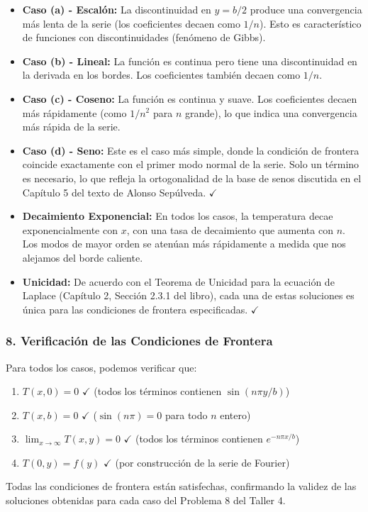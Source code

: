 \documentclass[a4paper]{article}
\begin{document}
\begin{itemize}
    \item \textbf{Caso (a) - Escalón:} La discontinuidad en $y = b/2$ produce una convergencia más lenta de la serie (los coeficientes decaen como $1/n$). Esto es característico de funciones con discontinuidades (fenómeno de Gibbs).
    
    \item \textbf{Caso (b) - Lineal:} La función es continua pero tiene una discontinuidad en la derivada en los bordes. Los coeficientes también decaen como $1/n$.
    
    \item \textbf{Caso (c) - Coseno:} La función es continua y suave. Los coeficientes decaen más rápidamente (como $1/n^2$ para $n$ grande), lo que indica una convergencia más rápida de la serie.
    
    \item \textbf{Caso (d) - Seno:} Este es el caso más simple, donde la condición de frontera coincide exactamente con el primer modo normal de la serie. Solo un término es necesario, lo que refleja la ortogonalidad de la base de senos discutida en el Capítulo 5 del texto de Alonso Sepúlveda. $\checkmark$
    
    \item \textbf{Decaimiento Exponencial:} En todos los casos, la temperatura decae exponencialmente con $x$, con una tasa de decaimiento que aumenta con $n$. Los modos de mayor orden se atenúan más rápidamente a medida que nos alejamos del borde caliente.
    
    \item \textbf{Unicidad:} De acuerdo con el Teorema de Unicidad para la ecuación de Laplace (Capítulo 2, Sección 2.3.1 del libro), cada una de estas soluciones es única para las condiciones de frontera especificadas. $\checkmark$
\end{itemize}

\subsubsection{8. Verificación de las Condiciones de Frontera}

Para todos los casos, podemos verificar que:
\begin{enumerate}
    \item $T(x, 0) = 0$ $\checkmark$ (todos los términos contienen $\sin(n\pi y/b)$)
    \item $T(x, b) = 0$ $\checkmark$ ($\sin(n\pi) = 0$ para todo $n$ entero)
    \item $\lim_{x \to \infty} T(x, y) = 0$ $\checkmark$ (todos los términos contienen $e^{-n\pi x/b}$)
    \item $T(0, y) = f(y)$ $\checkmark$ (por construcción de la serie de Fourier)
\end{enumerate}

Todas las condiciones de frontera están satisfechas, confirmando la validez de las soluciones obtenidas para cada caso del Problema 8 del Taller 4.




 
\end{document}
